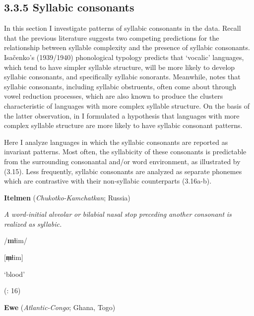 \subsection{3.3.5 Syllabic consonants}

  In this section I investigate patterns of syllabic consonants in the data. Recall that the previous literature suggests two competing predictions for the relationship between syllable complexity and the presence of syllabic consonants. Isačenko’s (1939/1940) phonological typology predicts that ‘vocalic’ languages, which tend to have simpler syllable structure, will be more likely to develop syllabic consonants, and specifically syllabic sonorants. Meanwhile, \citet{Bell1978a} notes that syllabic consonants, including syllabic obstruents, often come about through vowel reduction processes, which are also known to produce the clusters characteristic of languages with more complex syllable structure. On the basis of the latter observation, in  I formulated a hypothesis that languages with more complex syllable structure are more likely to have syllabic consonant patterns.



  Here I analyze languages in which the syllabic consonants are reported as invariant patterns. Most often, the syllabicity of these consonants is predictable from the surrounding consonantal and/or word environment, as illustrated by (3.15). Less frequently, syllabic consonants are analyzed as separate phonemes which are contrastive with their non-syllabic counterparts (3.16a-b).



\ea\label{ex:(3.15)}
  \textbf{Itelmen} (\textit{Chukotko-Kamchatkan}; Russia)



\textit{A} \textit{word-initial} \textit{alveolar} \textit{or} \textit{bilabial} \textit{nasal} \textit{stop} \textit{preceding} \textit{another} \textit{consonant} \textit{is} \textit{realized} \textit{as} \textit{syllabic.}



/\textbf{m}ɬim/



[\textbf{m̩}ɬim]



‘blood’



(\citealt{GeorgVolodin1999}: 16)
\z



\ea\label{ex:(3.16)}
  \textbf{Ewe} (\textit{Atlantic-Congo}; Ghana, Togo)



